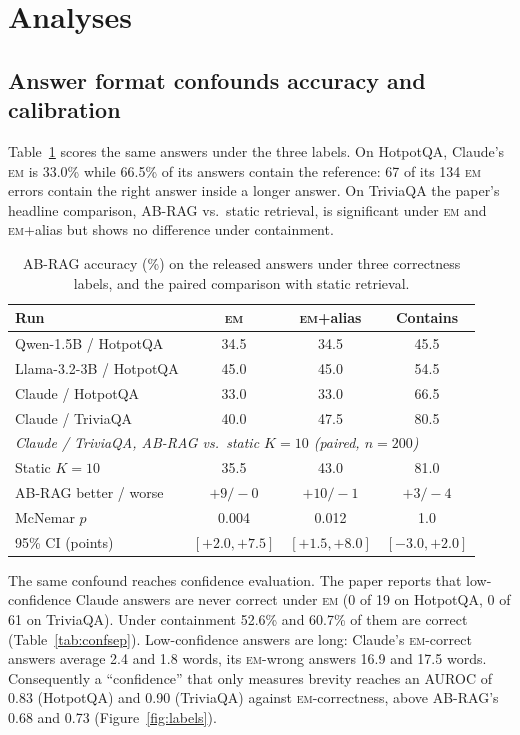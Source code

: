 \documentclass[11pt]{article}
\newcommand{\EM}{\textsc{em}}
\begin{document}
\section{Analyses}

\subsection{Answer format confounds accuracy and calibration}
\label{sec:format}

Table~\ref{tab:labels} scores the same answers under the three labels. On HotpotQA, Claude's \EM{} is 33.0\% while 66.5\% of its answers contain the reference: 67 of its 134 \EM{} errors contain the right answer inside a longer answer. On TriviaQA the paper's headline comparison, AB-RAG vs.\ static retrieval, is significant under \EM{} and \EM{}+alias but shows no difference under containment.

\begin{table}[t]
\centering
\small
\begin{tabular}{lccc}
\toprule
Run & \EM{} & \EM{}+alias & Contains \\
\midrule
Qwen-1.5B / HotpotQA & 34.5 & 34.5 & 45.5 \\
Llama-3.2-3B / HotpotQA & 45.0 & 45.0 & 54.5 \\
Claude / HotpotQA & 33.0 & 33.0 & 66.5 \\
Claude / TriviaQA & 40.0 & 47.5 & 80.5 \\
\midrule
\multicolumn{4}{l}{\emph{Claude / TriviaQA, AB-RAG vs.\ static $K{=}10$ (paired, $n=200$)}} \\
Static $K{=}10$ & 35.5 & 43.0 & 81.0 \\
AB-RAG better / worse & $+9/-0$ & $+10/-1$ & $+3/-4$ \\
McNemar $p$ & 0.004 & 0.012 & 1.0 \\
95\% CI (points) & $[+2.0, +7.5]$ & $[+1.5, +8.0]$ & $[-3.0, +2.0]$ \\
\bottomrule
\end{tabular}
\caption{AB-RAG accuracy (\%) on the released answers under three correctness labels, and the paired comparison with static retrieval.}
\label{tab:labels}
\end{table}

The same confound reaches confidence evaluation. The paper reports that low-confidence Claude answers are never correct under \EM{} (0 of 19 on HotpotQA, 0 of 61 on TriviaQA). Under containment 52.6\% and 60.7\% of them are correct (Table~\ref{tab:confsep}). Low-confidence answers are long: Claude's \EM{}-correct answers average 2.4 and 1.8 words, its \EM{}-wrong answers 16.9 and 17.5 words. Consequently a ``confidence'' that only measures brevity reaches an AUROC of 0.83 (HotpotQA) and 0.90 (TriviaQA) against \EM{}-correctness, above AB-RAG's 0.68 and 0.73 (Figure~\ref{fig:labels}).
\end{document}
